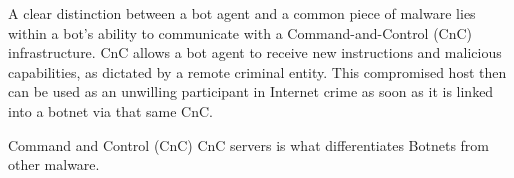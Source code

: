 A clear distinction between a bot agent and a common piece of malware lies within a bot’s ability to communicate with a Command-and-Control (CnC) infrastructure. CnC allows a bot agent to receive new instructions and malicious capabilities, as dictated by a remote criminal entity. This compromised host then can be used as an unwilling participant in Internet crime as soon as it is linked into a botnet via that same CnC.

Command and Control (CnC) CnC servers is what differentiates Botnets from other malware.

